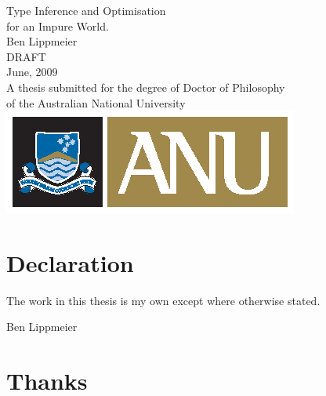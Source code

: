 \documentclass[a4paper,11pt]{book}
\begin{document}
\begin{titlepage}
\begin{center}
\vspace*{\fill}
\Huge Type Inference and Optimisation 
	\\ for an Impure World.
\\
\vfill\vfill
\Large Ben Lippmeier
\\
\vfill\vfill
	DRAFT
\\
	June, 2009
\\
\vfill\vfill 
\normalsize
      A thesis submitted for the degree of Doctor of Philosophy\\
      of the Australian National University
\vfill
      \includegraphics{ANU.eps}
\end{center}

\end{titlepage}


%


\chapter*{Declaration}\label{declaration}
\thispagestyle{empty}
The work in this thesis is my own except where otherwise stated.

\vspace{1in}

\hfill\hfill\hfill
%
Ben Lippmeier
%
\hspace*{\fill}

\chapter*{Thanks}\label{acknowledgements}
\end{document}
